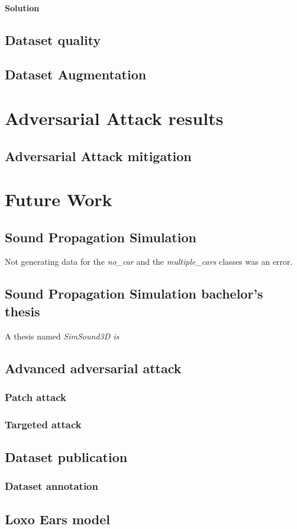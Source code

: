 \paragraph{Solution}




\subsection{Dataset quality}




\subsection{Dataset Augmentation}
\label{sec:augmentation_results}

\section{Adversarial Attack results}

\subsection{Adversarial Attack mitigation}

\section{Future Work}

\subsection{Sound Propagation Simulation}

Not generating data for the \textit{no\_car} and the \textit{multiple\_cars} classes was an error. 

\subsection{Sound Propagation Simulation bachelor's thesis}
A thesis named \it{SimSound3D} is 

\subsection{Advanced adversarial attack}

\subsubsection{Patch attack}

\subsubsection{Targeted attack}

\subsection{Dataset publication}

\subsubsection{Dataset annotation}

\subsection{Loxo Ears model}